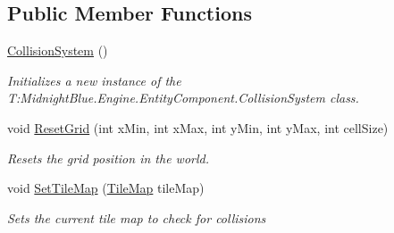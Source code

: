 \subsection*{Public Member Functions}
\begin{DoxyCompactItemize}
\item 
\hyperlink{class_midnight_blue_1_1_engine_1_1_entity_component_1_1_collision_system_a5554a62d950263148006d2e5f907da15}{Collision\+System} ()
\begin{DoxyCompactList}\small\item\em Initializes a new instance of the T\+:\+Midnight\+Blue.\+Engine.\+Entity\+Component.\+Collision\+System class. \end{DoxyCompactList}\item 
void \hyperlink{class_midnight_blue_1_1_engine_1_1_entity_component_1_1_collision_system_a2a394fb18708d26f3748d8006b4f692d}{Reset\+Grid} (int x\+Min, int x\+Max, int y\+Min, int y\+Max, int cell\+Size)
\begin{DoxyCompactList}\small\item\em Resets the grid position in the world. \end{DoxyCompactList}\item 
void \hyperlink{class_midnight_blue_1_1_engine_1_1_entity_component_1_1_collision_system_a7168bae1bfd6cd157b41b6f8cbe8c83d}{Set\+Tile\+Map} (\hyperlink{class_midnight_blue_1_1_engine_1_1_tiles_1_1_tile_map}{Tile\+Map} tile\+Map)
\begin{DoxyCompactList}\small\item\em Sets the current tile map to check for collisions \end{DoxyCompactList}\end{DoxyCompactItemize}
